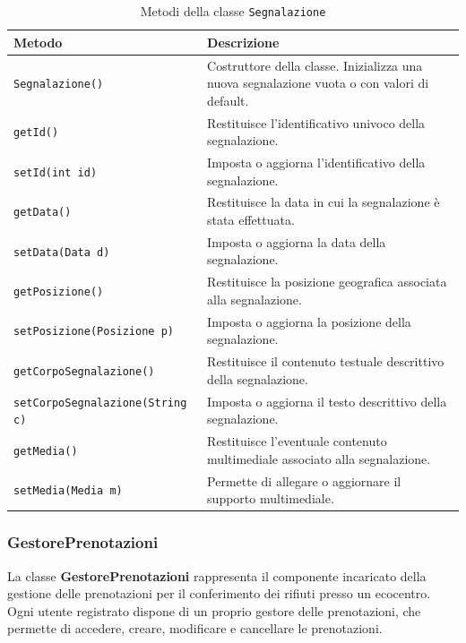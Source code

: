 \begin{table}[H]
\centering
\begin{tabularx}{\textwidth}{|l|X|}
\hline
\textbf{Metodo} & \textbf{Descrizione} \\
\hline
\texttt{Segnalazione()} & Costruttore della classe. Inizializza una nuova segnalazione vuota o con valori di default. \\
\hline
\texttt{getId()} & Restituisce l’identificativo univoco della segnalazione. \\
\hline
\texttt{setId(int id)} & Imposta o aggiorna l’identificativo della segnalazione. \\
\hline
\texttt{getData()} & Restituisce la data in cui la segnalazione è stata effettuata. \\
\hline
\texttt{setData(Data d)} & Imposta o aggiorna la data della segnalazione. \\
\hline
\texttt{getPosizione()} & Restituisce la posizione geografica associata alla segnalazione. \\
\hline
\texttt{setPosizione(Posizione p)} & Imposta o aggiorna la posizione della segnalazione. \\
\hline
\texttt{getCorpoSegnalazione()} & Restituisce il contenuto testuale descrittivo della segnalazione. \\
\hline
\texttt{setCorpoSegnalazione(String c)} & Imposta o aggiorna il testo descrittivo della segnalazione. \\
\hline
\texttt{getMedia()} & Restituisce l’eventuale contenuto multimediale associato alla segnalazione. \\
\hline
\texttt{setMedia(Media m)} & Permette di allegare o aggiornare il supporto multimediale. \\
\hline
\end{tabularx}
\caption{Metodi della classe \texttt{Segnalazione}}
\end{table}

\subsubsection{GestorePrenotazioni}

La classe \textbf{GestorePrenotazioni} rappresenta il componente incaricato della gestione delle prenotazioni per il conferimento dei rifiuti presso un ecocentro. Ogni utente registrato dispone di un proprio gestore delle prenotazioni, che permette di accedere, creare, modificare e cancellare le prenotazioni.

